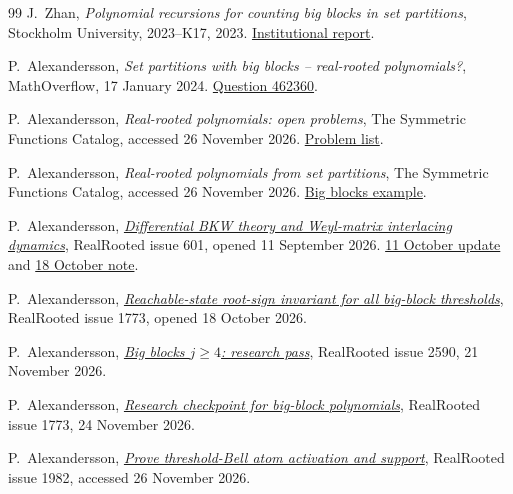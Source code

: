 \documentclass[11pt]{article}
\begin{document}
\begingroup
\small
\begin{thebibliography}{99}
\setlength{\itemsep}{2pt}
\setlength{\itemsep}{1pt}
\setlength{\parsep}{0pt}
J.~Zhan, \emph{Polynomial recursions for counting big blocks in set partitions},
Stockholm University, 2023--K17, 2023.
\href{https://kurser.math.su.se/pluginfile.php/16103/mod_folder/content/0/2023/2023_K17_report.pdf?forcedownload=1}{Institutional report}.

P.~Alexandersson, \emph{Set partitions with big blocks -- real-rooted polynomials?},
MathOverflow, 17 January 2024.
\href{https://mathoverflow.net/questions/462360/set-partitions-with-big-blocks-real-rooted-polynomials}{Question 462360}.

P.~Alexandersson, \emph{Real-rooted polynomials: open problems},
The Symmetric Functions Catalog, accessed 26 November 2026.
\href{https://www.symmetricfunctions.com/realRootedOpenProblems.htm}{Problem list}.

P.~Alexandersson, \emph{Real-rooted polynomials from set partitions},
The Symmetric Functions Catalog, accessed 26 November 2026.
\href{https://www.symmetricfunctions.com/realRootedSetPartitions.htm}{Big blocks example}.

P.~Alexandersson,
\href{https://github.com/PerAlexandersson/RealRooted/issues/601}{\emph{Differential BKW theory and Weyl-matrix interlacing dynamics}},
RealRooted issue 601, opened 11 September 2026.
\href{https://github.com/PerAlexandersson/RealRooted/issues/601\#issuecomment-6108976046}{11 October update} and
\href{https://github.com/PerAlexandersson/RealRooted/issues/601\#issuecomment-6249731241}{18 October note}.

P.~Alexandersson,
\href{https://github.com/PerAlexandersson/RealRooted/issues/1773}{\emph{Reachable-state root-sign invariant for all big-block thresholds}},
RealRooted issue 1773, opened 18 October 2026.

P.~Alexandersson,
\href{https://github.com/PerAlexandersson/RealRooted/issues/2590\#issuecomment-7059635458}{\emph{Big blocks \(j\ge4\): research pass}},
RealRooted issue 2590, 21 November 2026.

P.~Alexandersson,
\href{https://github.com/PerAlexandersson/RealRooted/issues/1773\#issuecomment-7139029318}{\emph{Research checkpoint for big-block polynomials}},
RealRooted issue 1773, 24 November 2026.

P.~Alexandersson,
\href{https://github.com/PerAlexandersson/RealRooted/issues/1982}{\emph{Prove threshold-Bell atom activation and support}},
RealRooted issue 1982, accessed 26 November 2026.


\end{thebibliography}
\end{document}
